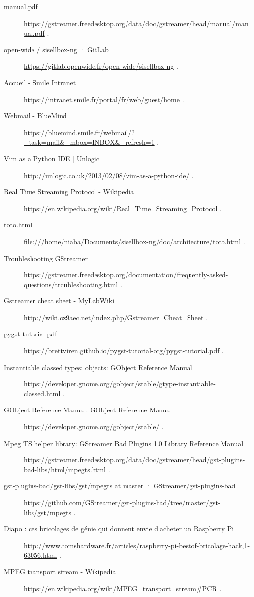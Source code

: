 \begin{description}
\item [manual.pdf] \url{https://gstreamer.freedesktop.org/data/doc/gstreamer/head/manual/manual.pdf} . 
\item [open-wide / sisellbox-ng · GitLab] \url{https://gitlab.openwide.fr/open-wide/sisellbox-ng} . 
\item [Accueil - Smile Intranet] \url{https://intranet.smile.fr/portal/fr/web/guest/home} . 
\item [Webmail - BlueMind] \url{https://bluemind.smile.fr/webmail/?_task=mail&_mbox=INBOX&_refresh=1} . 
\item [Vim as a Python IDE | Unlogic] \url{http://unlogic.co.uk/2013/02/08/vim-as-a-python-ide/} . 
\item [Real Time Streaming Protocol - Wikipedia] \url{https://en.wikipedia.org/wiki/Real_Time_Streaming_Protocol} . 
\item [toto.html] \url{file:///home/niaba/Documents/sisellbox-ng/doc/architecture/toto.html} . 
\item [Troubleshooting GStreamer] \url{https://gstreamer.freedesktop.org/documentation/frequently-asked-questions/troubleshooting.html} . 
\item [Gstreamer cheat sheet - MyLabWiki] \url{http://wiki.oz9aec.net/index.php/Gstreamer_Cheat_Sheet} . 
\item [pygst-tutorial.pdf] \url{https://brettviren.github.io/pygst-tutorial-org/pygst-tutorial.pdf} . 
\item [Instantiable classed types: objects: GObject Reference Manual] \url{https://developer.gnome.org/gobject/stable/gtype-instantiable-classed.html} . 
\item [GObject Reference Manual: GObject Reference Manual] \url{https://developer.gnome.org/gobject/stable/} . 
\item [Mpeg TS helper library: GStreamer Bad Plugins 1.0 Library Reference Manual] \url{https://gstreamer.freedesktop.org/data/doc/gstreamer/head/gst-plugins-bad-libs/html/mpegts.html} . 
\item [gst-plugins-bad/gst-libs/gst/mpegts at master · GStreamer/gst-plugins-bad] \url{https://github.com/GStreamer/gst-plugins-bad/tree/master/gst-libs/gst/mpegts} . 
\item [Diapo : ces bricolages de génie qui donnent envie d'acheter un Raspberry Pi] \url{http://www.tomshardware.fr/articles/raspberry-pi-bestof-bricolage-hack,1-63056.html} . 
\item [MPEG transport stream - Wikipedia] \url{https://en.wikipedia.org/wiki/MPEG_transport_stream#PCR} . 

\end{description}
